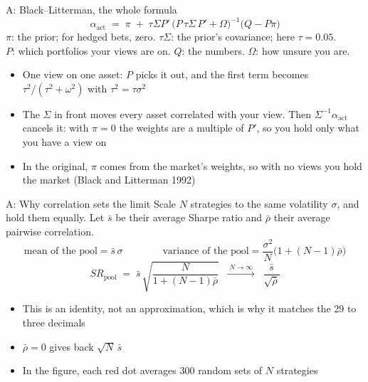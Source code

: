\documentclass[aspectratio=169,10pt]{beamer}
\begin{document}
\begin{frame}[label=appendix_bl]{A: Black--Litterman, the whole formula}
\[ \alpha_{\text{act}} \;=\; \pi \;+\; \tau\Sigma P'\,\big(P\,\tau\Sigma\, P' + \Omega\big)^{-1}\big(Q - P\pi\big) \]
\vskip 4pt
{\small $\pi$: the prior; for hedged bets, zero. \quad $\tau\Sigma$: the prior's covariance; here $\tau = 0.05$. \\
$P$: which portfolios your views are on. \quad $Q$: the numbers. \quad $\Omega$: how unsure you are.}
\vskip 10pt
\begin{itemize}
\item One view on one asset: $P$ picks it out, and the first term becomes $\tau^{2}/(\tau^{2}+\omega^{2})$ with $\tau^{2}=\tau\sigma^{2}$
\vskip 6pt
\item The $\Sigma$ in front moves every asset correlated with your view. Then $\Sigma^{-1}\alpha_{\text{act}}$ cancels it: with $\pi=0$ the weights are a multiple of $P'$, so you hold only what you have a view on
\vskip 6pt
\item In the original, $\pi$ comes from the market's weights, so with no views you hold the market (Black and Litterman 1992)
\end{itemize}
\hfill \hyperlink{back_bl}{}
\end{frame}

\begin{frame}[label=appendix_pool]{A: Why correlation sets the limit}
Scale $N$ strategies to the same volatility $\sigma$, and hold them equally. Let $\bar{s}$ be their average Sharpe ratio and $\bar\rho$ their average pairwise correlation.
\vskip 8pt
\[ \text{mean of the pool} = \bar{s}\,\sigma \qquad\qquad
   \text{variance of the pool} = \frac{\sigma^{2}}{N}\Big(1 + (N-1)\bar\rho\Big) \]
\vskip 6pt
\[ SR_{\text{pool}} \;=\; \bar{s}\,\sqrt{\frac{N}{1+(N-1)\bar\rho}} \;\;\xrightarrow{\;N\to\infty\;}\;\; \frac{\bar{s}}{\sqrt{\bar\rho}} \]
\vskip 6pt
\begin{itemize}
\item This is an identity, not an approximation, which is why it matches the 29 to three decimals
\vskip 6pt
\item $\bar\rho = 0$ gives back $\sqrt{N}\,\bar{s}$
\vskip 6pt
\item In the figure, each red dot averages 300 random sets of $N$ strategies
\end{itemize}
\hfill \hyperlink{appendix_pool_back}{}
\end{frame}
\end{document}
